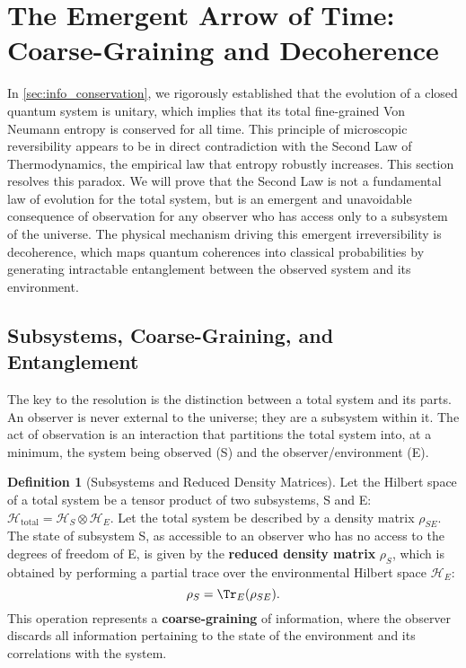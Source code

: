 \documentclass[11pt, letterpaper]{report}
\theoremstyle{plain} %
\theoremstyle{definition} %
\newtheorem{definition}{Definition}[chapter]
\theoremstyle{remark} %
\begin{document}
\section{The Emergent Arrow of Time: Coarse-Graining and Decoherence}
\label{sec:emergent_arrow}

In \cref{sec:info_conservation}, we rigorously established that the evolution of a closed quantum system is unitary, which implies that its total fine-grained Von Neumann entropy is conserved for all time. This principle of microscopic reversibility appears to be in direct contradiction with the Second Law of Thermodynamics, the empirical law that entropy robustly increases. This section resolves this paradox. We will prove that the Second Law is not a fundamental law of evolution for the total system, but is an emergent and unavoidable consequence of observation for any observer who has access only to a subsystem of the universe. The physical mechanism driving this emergent irreversibility is decoherence, which maps quantum coherences into classical probabilities by generating intractable entanglement between the observed system and its environment.

\subsection{Subsystems, Coarse-Graining, and Entanglement}
The key to the resolution is the distinction between a total system and its parts. An observer is never external to the universe; they are a subsystem within it. The act of observation is an interaction that partitions the total system into, at a minimum, the system being observed (S) and the observer/environment (E).

\begin{definition}[Subsystems and Reduced Density Matrices]
Let the Hilbert space of a total system be a tensor product of two subsystems, S and E: $\mathcal{H}_{\text{total}} = \mathcal{H}_S \otimes \mathcal{H}_E$. Let the total system be described by a density matrix $\rho_{SE}$. The state of subsystem S, as accessible to an observer who has no access to the degrees of freedom of E, is given by the \textbf{reduced density matrix} $\rho_S$, which is obtained by performing a partial trace over the environmental Hilbert space $\mathcal{H}_E$:
\begin{equation}
    \rho_S = \Tr_E(\rho_{SE}).
    \label{eq:reduced_density_matrix}
\end{equation}
This operation represents a \textbf{coarse-graining} of information, where the observer discards all information pertaining to the state of the environment and its correlations with the system.
\end{definition}
\end{document}
